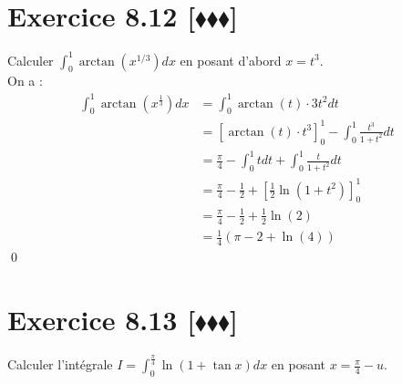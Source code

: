 \documentclass[10pt]{article}
\begin{document}
\section*{Exercice 8.12 [$\blacklozenge\blacklozenge\blacklozenge$]}
\begin{tcolorbox}[enhanced, width=7in, center, size=fbox, fontupper=\large, drop shadow southwest]
    Calculer $\int_0^1{\arctan(x^{1/3})dx}$ en posant d'abord $x=t^3$.\\
    On a :
    \begin{align*}
        \int_0^1{\arctan(x^{\frac{1}{3}})dx}&=\int_0^1{\arctan(t)\cdot3t^2dt}\\
        &=\left[\arctan(t)\cdot t^3\right]_0^1 - \int_0^1{\frac{t^3}{1+t^2} dt}\\
        &=\frac{\pi}{4} - \int_0^1{tdt}+\int_0^1{\frac{t}{1+t^2}dt}\\
        &=\frac{\pi}{4} - \frac{1}{2} + \left[\frac{1}{2}\ln(1+t^2)\right]_0^1\\
        &=\frac{\pi}{4} - \frac{1}{2} + \frac{1}{2}\ln(2)\\
        &=\frac{1}{4}\left(\pi - 2 + \ln(4)\right)
    \end{align*}
    \qed
\end{tcolorbox}


\section*{Exercice 8.13 [$\blacklozenge\blacklozenge\blacklozenge$]}
\begin{tcolorbox}[enhanced, width=7in, center, size=fbox, fontupper=\large, drop shadow southwest]
    Calculer l'intégrale $I = \int_0^{\frac{\pi}{4}}{\ln(1+\tan x)dx}$ en posant $x=\frac{\pi}{4}-u$.
\end{tcolorbox}

\end{document}
